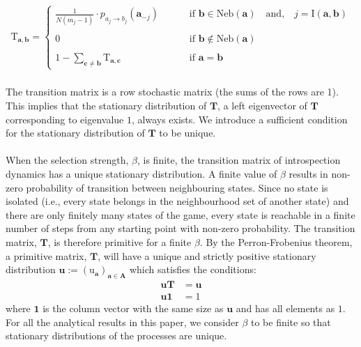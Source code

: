 \documentclass[11pt]{article}
\theoremstyle{plainCl1}
\newtheorem{Prop}{Proposition}
\theoremstyle{plainCl2}
\newcommand{\A}{\mathbf{A}}
\newcommand{\abf}{\mathbf{a}}
\newcommand{\bbf}{\mathbf{b}}
\newcommand{\cbf}{\mathbf{c}}
\newcommand{\T}{\mathbf{T}}
\newcommand{\ubf}{\mathbf{u}}
\begin{document}
\begin{align}
\mathrm{T}_{\abf, \bbf} = 
\begin{cases}
\frac{1}{N(m_j-1)}  \cdot p_{a_{j} \to b_{j}} (\abf_{-j}) \quad  \quad &\text{ if }\bbf \in \mathrm{Neb}(\abf) \quad \text{and,} \quad j = \mathrm{I}(\abf,\bbf)\\ \\ 
0 \quad &\text{ if } \bbf \notin \mathrm{Neb}(\abf) \\ \\
1 - \sum_{\cbf \neq \bbf} \mathrm{T}_{\abf,\cbf} \quad &\text{ if } \abf = \bbf
\end{cases}
\label{Eq:transition-matrix}
\end{align} \\ 
\noindent The transition matrix is a row stochastic matrix (the sums of the rows are 1). This implies that the stationary distribution of $\T$, a left eigenvector of $\T$ corresponding to eigenvalue $1$, always exists. We introduce a sufficient condition for the stationary distribution of $\T$ to be unique. 
\\ \\
\noindent When the selection strength, $\beta$, is finite, the transition matrix of introspection dynamics has a unique stationary distribution. A finite value of $\beta$ results in non-zero probability of transition between neighbouring states. Since no state is isolated (i.e., every state belongs in the neighbourhood set of another state) and there are only finitely many states of the game, every state is reachable in a finite number of steps from any starting point with non-zero probability. The transition matrix, $\T$, is therefore primitive for a finite $\beta$. By the Perron-Frobenius theorem, a primitive matrix, $\T$, will have a unique and strictly positive stationary distribution $\ubf := (\mathrm{u}_\abf)_{\abf \in \A}$ which satisfies the conditions: 
\begin{eqnarray}
\label{Eq:lefteigenvector}
\ubf \T &= \ubf \\ 
\label{Eq:normalizationcondition}
\ubf \mathbf{1} &= 1
\end{eqnarray}
\noindent where $\mathbf{1}$ is the column vector with the same size as $\ubf$ and has all elements as $1$. For all the analytical results in this paper, we consider $\beta$ to be finite so that stationary distributions of the processes are unique. \\ \\
\end{document}
